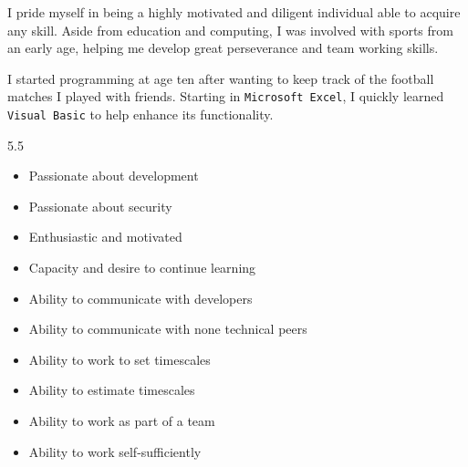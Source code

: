 \documentclass[9pt]{developercv} %
\begin{document}
\begin{minipage}[t]{0.4\textwidth} %
  \vspace{-\baselineskip} %

  I pride myself in being a highly motivated and diligent individual able to acquire any skill.
  Aside from education and computing, I was involved with sports from an early age, helping me develop great perseverance and team working skills. 

  I started programming at age ten after wanting to keep track of the football matches I played with friends. Starting in \texttt{Microsoft Excel}, I quickly learned \texttt{Visual Basic} to help enhance its functionality.
\end{minipage}
\hfill %
\begin{minipage}[t]{0.5\textwidth} %
  \vspace{-\baselineskip} %
  \begin{barchart}{5.5}
  \end{barchart}
\end{minipage}

\begin{minipage}[t]{0.5\textwidth} %
  \vspace{-\baselineskip} %
  \vspace{10mm}
  \begin{itemize}
    \item Passionate about development
    \item Passionate about security
    \item Enthusiastic and motivated 
    \item Capacity and desire to continue learning
    \item Ability to communicate with developers
  \end{itemize}
\end{minipage}
\hfill %
\begin{minipage}[t]{0.5\textwidth} %
  \vspace{5mm}
  \begin{itemize}
    \item Ability to communicate with none technical peers
    \item Ability to work to set timescales
    \item Ability to estimate timescales 
    \item Ability to work as part of a team
    \item Ability to work self-sufficiently
  \end{itemize}
\end{minipage}
\end{document}
